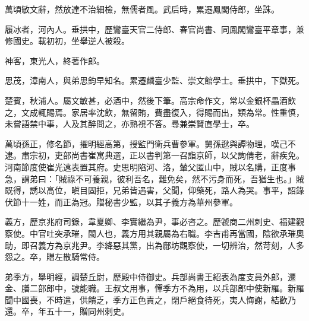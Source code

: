 \begin{pinyinscope}
 萬頃敏文辭，然放達不治細檢，無儒者風。武后時，累遷鳳閣侍郎，坐誅。



 履冰者，河內人。垂拱中，歷鸞臺天官二侍郎、春官尚書、同鳳閣鸞臺平章事，兼修國史。載初初，坐舉逆人被殺。



 神客，東光人，終著作郎。



 思茂，漳南人，與弟思鈞早知名。累遷麟臺少監、崇文館學士。垂拱中，下獄死。



 楚賓，秋浦人。屬文敏甚，必酒中，然後下筆。高宗命作文，常以金銀杯畾酒飲之，文成輒賜焉。家居率沈飲，無留賄，費盡復入，得賜而出，類為常。性重慎，未嘗語禁中事，人及其醉問之，亦熟視不答。尋兼崇賢直學士，卒。



 萬頃孫正，修名節，擢明經高第，授監門衛兵曹參軍。舅孫逖與譚物理，嘆己不逮。肅宗初，吏部尚書崔寓典選，正以書判第一召詣京師，以父詢倩老，辭疾免。河南節度使崔光遠表置其府。史思明陷河、洛，輦父匿山中，賊以名購，正度事急，謂弟曰：「賊祿不可養親，彼利吾名，難免矣，然不污身而死，吾猶生也。」賊既得，誘以高位，瞋目固拒，兄弟皆遇害，父聞，仰藥死，路人為哭。事平，詔錄伏節十一姓，而正為冠。贈秘書少監，以其子義方為華州參軍。



 義方，歷京兆府司錄，韋夏卿、李實繼為尹，事必咨之。歷虢商二州刺史、福建觀察使。中官吐突承璀，閩人也，義方用其親屬為右職。李吉甫再當國，陰欲承璀奧助，即召義方為京兆尹。李絳惡其黨，出為鄜坊觀察使，一切辨治，然苛刻，人多怨之。卒，贈左散騎常侍。



 弟季方，舉明經，調楚丘尉，歷殿中侍御史。兵部尚書王紹表為度支員外郎，遷金、膳二部郎中，號能職。王叔文用事，憚季方不為用，以兵部郎中使新羅。新羅聞中國喪，不時遣，供饋乏，季方正色責之，閉戶絕食待死，夷人悔謝，結歡乃還。卒，年五十一，贈同州刺史。



\end{pinyinscope}